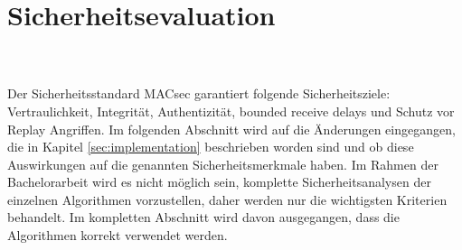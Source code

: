 \section{Sicherheitsevaluation}
\label{sec:sicherheitsevalutation}
\\
\\
Der Sicherheitsstandard MACsec garantiert folgende Sicherheitsziele: Vertraulichkeit, Integrität, Authentizität, bounded receive delays und Schutz vor Replay Angriffen. Im folgenden Abschnitt wird auf die Änderungen eingegangen, die in Kapitel \ref{sec:implementation} beschrieben worden sind und ob diese Auswirkungen auf die genannten Sicherheitsmerkmale haben. Im Rahmen der Bachelorarbeit wird es nicht möglich sein, komplette Sicherheitsanalysen der einzelnen Algorithmen vorzustellen, daher werden nur die wichtigsten Kriterien behandelt. Im kompletten Abschnitt wird davon ausgegangen, dass die Algorithmen korrekt verwendet werden.
